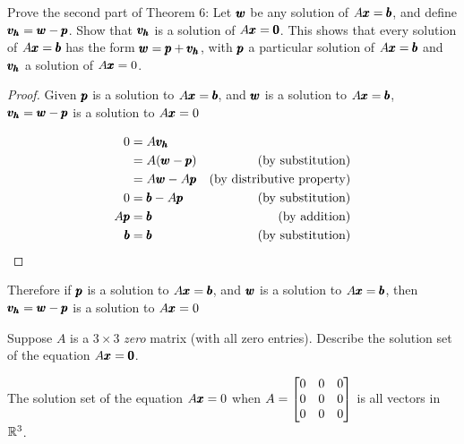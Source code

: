 \documentclass{../mathhomework}
\newcommand{\By}[1]{\text{(by #1)}}
\newenvironment{Mat}{\begin{bmatrix}}{\end{bmatrix}}
\begin{document}
\pagebreak
\begin{problem}[1.5\#25]
    Prove the second part of Theorem 6: Let $\pmb{w}$ be any solution of $A\pmb{x} = \pmb{b}$, and define $\pmb{v_h} = \pmb{w} - \pmb{p}$. Show that $\pmb{v_h}$ is a solution of $A\pmb{x} = \pmb{0}$.
    This shows that every solution of $A\pmb{x} = \pmb{b}$ has the form $\pmb{w} = \pmb{p} + \pmb{v_h}$, with $\pmb{p}$ a particular solution of $A\pmb{x} = \pmb{b}$ and $\pmb{v_h}$ a solution of $A\pmb{x} = 0$.

    \begin{solution}
        \begin{proof}
            Given $\pmb{p}$ is a solution to $A\pmb{x} = \pmb{b}$, and $\pmb{w}$ is a solution to $A\pmb{x} = \pmb{b}$, $\pmb{v_h} = \pmb{w} - \pmb{p}$ is a solution to $A\pmb{x} = 0$

            \begin{align}
                0 & = A\Vect{v_h} \\
                & = A(\Vect{w} - \Vect{p}) &\By{substitution}\\
                & = A\Vect{w} - A\Vect{p} &\By{distributive property}\\
                0 & = \Vect{b} - A\Vect{p} &\By{substitution}\\
                A\Vect{p} & = \Vect{b} &\By{addition}\\
                \Vect{b} & = \Vect{b} &\By{substitution}
            \end{align}
        \end{proof}

        Therefore if $\pmb{p}$ is a solution to $A\pmb{x} = \pmb{b}$, and $\pmb{w}$ is a solution to $A\pmb{x} = \pmb{b}$, then $\pmb{v_h} = \pmb{w} - \pmb{p}$ is a solution to $A\pmb{x} = 0$
    \end{solution}
\end{problem}

\begin{problem}[1.5\#27]
    Suppose $A$ is a $3 \times 3$ \textit{zero} matrix (with all zero entries). Describe the solution set of the equation $A\pmb{x} = \pmb{0}$.

    \begin{solution}
        The solution set of the equation $A\pmb{x} = 0$ when $A = \begin{Mat}
            0 & 0 & 0\\
            0 & 0 & 0\\
            0 & 0 & 0
        \end{Mat}$ is all vectors in $\mathbb{R}^3$.
    \end{solution}
\end{problem}
\end{document}
